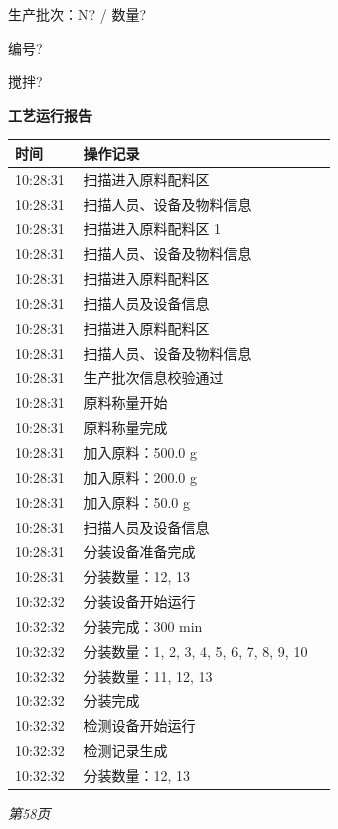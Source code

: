 \documentclass[UTF8,10pt,a4paper,fontset=fandol]{ctexart}
\newcommand{\fieldvalue}[1]{#1}
\newcommand{\handwritten}[1]{#1}
\begin{document}
\begin{center}
\begin{minipage}[t]{0.46\linewidth}
\medskip
\fieldvalue{\handwritten{生产批次：N? / 数量?}}

\fieldvalue{\handwritten{编号?}}

\fieldvalue{\handwritten{搅拌?}}
\end{minipage}
\hfill
\begin{minipage}[t]{0.46\linewidth}
\centering
\textbf{工艺运行报告}

\scriptsize
\begin{tabular}{|p{0.20\linewidth}|p{0.74\linewidth}|}
\hline
时间 & 操作记录\\
\hline
10:28:31 & 扫描进入原料配料区\\
10:28:31 & 扫描人员、设备及物料信息\\
10:28:31 & 扫描进入原料配料区 1\\
10:28:31 & 扫描人员、设备及物料信息\\
10:28:31 & 扫描进入原料配料区\\
10:28:31 & 扫描人员及设备信息\\
10:28:31 & 扫描进入原料配料区\\
10:28:31 & 扫描人员、设备及物料信息\\
10:28:31 & 生产批次信息校验通过\\
10:28:31 & 原料称量开始\\
10:28:31 & 原料称量完成\\
10:28:31 & 加入原料：500.0 g\\
10:28:31 & 加入原料：200.0 g\\
10:28:31 & 加入原料：50.0 g\\
10:28:31 & 扫描人员及设备信息\\
10:28:31 & 分装设备准备完成\\
10:28:31 & 分装数量：12, 13\\
10:32:32 & 分装设备开始运行\\
10:32:32 & 分装完成：300 min\\
10:32:32 & 分装数量：1, 2, 3, 4, 5, 6, 7, 8, 9, 10\\
10:32:32 & 分装数量：11, 12, 13\\
10:32:32 & 分装完成\\
10:32:32 & 检测设备开始运行\\
10:32:32 & 检测记录生成\\
10:32:32 & 分装数量：12, 13\\
\hline
\end{tabular}

\vfill
\textit{第58页}
\end{minipage}
\end{center}
\end{document}
